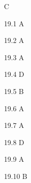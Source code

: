 \begin{Solution}{19}
C
\end{Solution}
\begin{Solution}{19.{1}}
A
\end{Solution}
\begin{Solution}{19.{2}}
A
\end{Solution}
\begin{Solution}{19.{3}}
A
\end{Solution}
\begin{Solution}{19.{4}}
D
\end{Solution}
\begin{Solution}{19.{5}}
B
\end{Solution}
\begin{Solution}{19.{6}}
A
\end{Solution}
\begin{Solution}{19.{7}}
A
\end{Solution}
\begin{Solution}{19.{8}}
D
\end{Solution}
\begin{Solution}{19.{9}}
A
\end{Solution}
\begin{Solution}{19.{10}}
B
\end{Solution}

